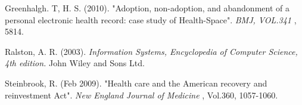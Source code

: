 \documentclass[12pt]{article}
\begin{document}
Greenhalgh. T, H. S. (2010). "Adoption, non-adoption, and abandonment of a personal electronic health record: case study of Health-Space". \textit{BMJ, VOL.341} , 5814.\par

Ralston, A. R. (2003). \textit{Information Systems, Encyclopedia of Computer Science, 4th edition.} John Wiley and Sons Ltd.\par

Steinbrook, R. (Feb 2009). "Health care and the American recovery and reinvestment Act". \textit{New England Journal of Medicine} , Vol.360, 1057-1060.\par


\vspace{\baselineskip}

\vspace{\baselineskip}

\vspace{\baselineskip}

\vspace{\baselineskip}
\setlength{\parskip}{0.0pt}

\vspace{\baselineskip}
\vspace{\baselineskip}
\setlength{\parskip}{8.04pt}

\vspace{\baselineskip}
\end{document}
